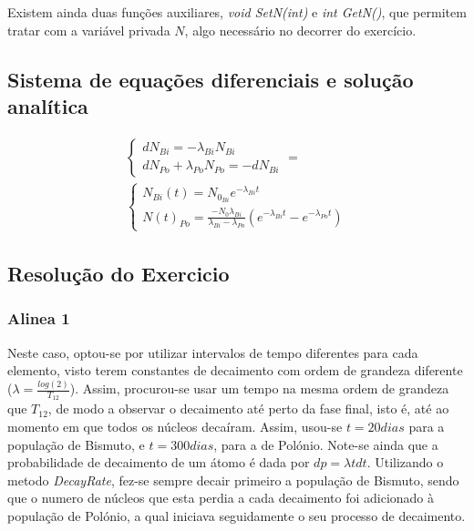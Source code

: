 \documentclass{article}
\begin{document}
\begin{multicols}{2}
  Existem ainda duas funções auxiliares, \textit{void SetN(int)} e \textit{int GetN()}, que permitem tratar com a variável privada $N$, algo necessário no decorrer do exercício.

  \subsection{Sistema de equações diferenciais e solução analítica}

 \begin{equation}
 \begin{split}
  \begin{cases}
    dN_{Bi}=-\lambda_{Bi}N_{Bi}\\ 
    dN_{Po}+\lambda_{Po}N_{Po}=-dN_{Bi}
  \end{cases}
  =\\
  \begin{cases}
    N_{Bi}(t)=N_{0_{Bi}}e^{-\lambda_{Bi}t}\\ 
    N(t)_{Po}=\frac{-N_0\lambda_{Bi}}{\lambda_{Bi}-\lambda_{Po}}(e^{-\lambda_{Bi}t}-e^{-\lambda_{Po}t})
  \end{cases}
  \end{split}
  \end{equation}

  \subsection{Resolução do Exercicio}

  \subsubsection{Alinea 1}

  Neste caso, optou-se por utilizar intervalos de tempo diferentes para cada elemento, visto terem constantes de decaimento com ordem de grandeza diferente ($\lambda = \frac{log(2)}{T_{12}}$). Assim, procurou-se usar um tempo na mesma ordem de grandeza que $T_{12}$, de modo a observar o decaimento até perto da fase final, isto é, até ao momento em que todos os núcleos decaíram. Assim, usou-se $t = 20 dias$ para a população de Bismuto, e $t = 300 dias$, para a de Polónio. Note-se ainda que a probabilidade de decaimento de um átomo é dada por $dp = \lambda tdt$. Utilizando o metodo \textit{DecayRate}, fez-se sempre decair primeiro a população de Bismuto, sendo que o numero de núcleos que esta perdia a cada decaimento foi adicionado à população de Polónio, a qual iniciava seguidamente o seu processo de decaimento.


\end{multicols}
\end{document}
